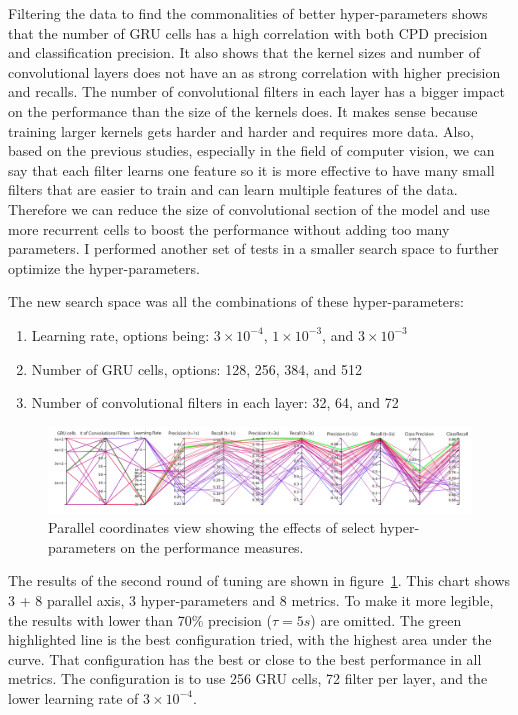 Filtering the data to find the commonalities of better hyper-parameters shows that the number of GRU cells has a high correlation with both CPD precision and classification precision. 
It also shows that the kernel sizes and number of convolutional layers does not have an as strong correlation with higher precision and recalls. The number of convolutional filters in each layer has a bigger impact on the performance than the size of the kernels does. 
It makes sense because training larger kernels gets harder and harder and requires more data. Also, based on the previous studies, especially in the field of computer vision, we can say that each filter learns one feature so it is more effective to have many small filters that are easier to train and can learn multiple features of the data.
Therefore we can reduce the size of convolutional section of the model and use more recurrent cells to boost the performance without adding too many parameters. I performed another set of tests in a smaller search space to further optimize the hyper-parameters.

The new search space was all the combinations of these hyper-parameters:

\begin{enumerate}
    \item Learning rate, options being: $3\times10^{-4}$, $1\times10^{-3}$, and $3\times10^{-3}$
    \item Number of GRU cells, options: 128, 256, 384, and 512
    \item Number of convolutional filters in each layer: 32, 64, and 72
\end{enumerate}

\begin{figure}
    \centering
    \includegraphics[width=\columnwidth]{6_files/refined_prec_recall_white_background.png}
    \caption{Parallel coordinates view showing the effects of select hyper-parameters on the performance measures.}
    \label{fig:precision_recall_parallel_coordinates}
\end{figure}
The results of the second round of tuning are shown in figure~\ref{fig:precision_recall_parallel_coordinates}. This chart shows 3 + 8 parallel axis, 3 hyper-parameters and 8 metrics. To make it more legible, the results with lower than 70\% precision ($\tau = 5s$) are omitted.
The green highlighted line is the best configuration tried, with the highest area under the curve. That configuration has the best or close to the best performance in all metrics. The configuration is to use 256 GRU cells, 72 filter per layer, and the lower learning rate of $3\times10^{-4}$.

